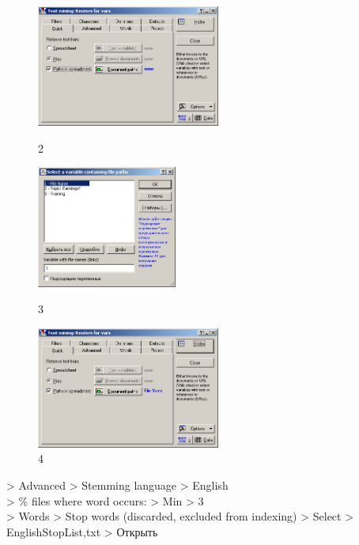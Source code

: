 \begin{figure}[!h]
  \centering

  \begin{minipage}{0.32\textwidth}
    \centering

    \includegraphics[height=4cm]
    {inc/var5/2.PNG}

    \caption{2}

    \label{fig:var5_2}
  \end{minipage}
  \begin{minipage}{0.32\textwidth}
    \centering

    \includegraphics[height=4cm]
    {inc/var5/3.PNG}

    \caption{3}

    \label{fig:var5_3}
  \end{minipage}
  \begin{minipage}{0.32\textwidth}
    \centering

    \includegraphics[height=4cm]
    {inc/var5/4.PNG}

    \caption{4}

    \label{fig:var5_4}
  \end{minipage}
\end{figure}


> Advanced > Stemming language > English \\
> \% files where word occurs: > Min > 3 \\
> Words > Stop words (discarded, excluded from indexing) > Select > EnglishStopList,txt > Открыть \\

